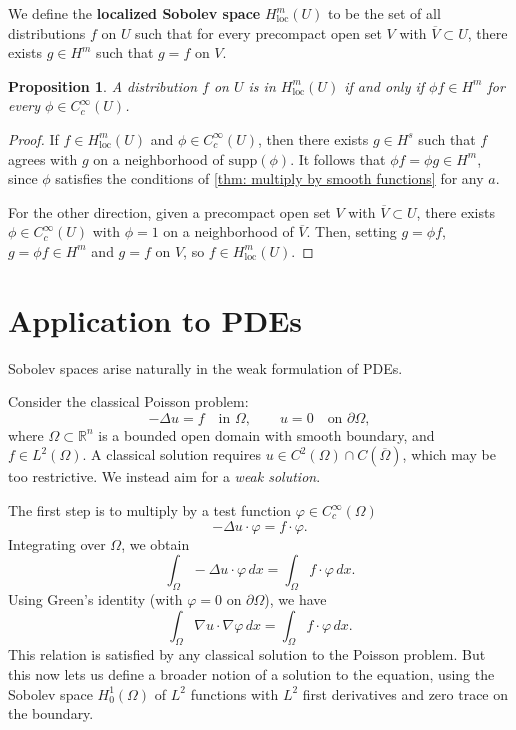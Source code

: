 \documentclass[12pt,letterpaper,reqno]{article}
\theoremstyle{plain}                              %
\newtheorem{prop}[thm]{Proposition}
\theoremstyle{definition}                         %
\theoremstyle{remark}                             %
\numberwithin{equation}{section}
\begin{document}
We define the \textbf{localized Sobolev space} $H_\mathrm{loc}^m(U)$ to be the set of all distributions $f$ on $U$ such that for every precompact open set $V$ with $\overline{V}\subset U$, there exists $g\in H^m$ such that $g=f$ on $V$.

\begin{prop}\label{prop: localized sobolev space}
    A distribution $f$ on $U$ is in $H_{\mathrm{loc}}^m(U)$ if and only if $\phi f\in H^m$ for every $\phi\in C_c^\infty(U)$.
\end{prop}
\begin{proof}
    If $f\in H_{\mathrm{loc}}^m(U)$ and $\phi\in C_c^\infty(U)$, then there exists $g\in H^s$ such that $f$ agrees with $g$ on a neighborhood of $\mathrm{supp}(\phi)$. It follows that $\phi f= \phi g \in H^m$, since $\phi$ satisfies the conditions of \cref{thm: multiply by smooth functions} for any $a$. 

    For the other direction, given a precompact open set $V$ with $\overline{V}\subset U$, there exists $\phi\in C_c^\infty(U)$ with $\phi=1$ on a neighborhood of $\overline{V}$. Then, setting $g=\phi f$, $g=\phi f\in H^m$ and $g = f$ on $V$, so $f\in H_{\mathrm{loc}}^m(U)$.
\end{proof}
\section{Application to PDEs}
Sobolev spaces arise naturally in the weak formulation of PDEs.

Consider the classical Poisson problem:
\[
- \Delta u = f \quad \text{in } \Omega, \qquad u = 0 \quad \text{on } \partial \Omega,
\]
where $\Omega \subset \mathbb{R}^n$ is a bounded open domain with smooth boundary, and $f \in L^2(\Omega)$. A classical solution requires $u \in C^2(\Omega) \cap C(\overline{\Omega})$, which may be too restrictive. We instead aim for a \textit{weak solution}.

The first step is to multiply by a test function $\varphi\in C_c^\infty(\Omega)$
\[
-\Delta u \cdot \varphi = f \cdot \varphi.
\]
Integrating over $\Omega$, we obtain
\[
\int_\Omega -\Delta u \cdot \varphi \, dx = \int_\Omega f \cdot \varphi \, dx.
\]
Using Green's identity (with $\varphi = 0$ on $\partial \Omega$), we have
\[
\int_\Omega \nabla u \cdot \nabla \varphi \, dx = \int_\Omega f \cdot \varphi \, dx.
\]
This relation is satisfied by any classical solution to the Poisson problem. But this now lets us define a broader notion of a solution to the equation, using the Sobolev space $H_0^1(\Omega)$ of $L^2$ functions with $L^2$ first derivatives and zero trace on the boundary.
\end{document}
